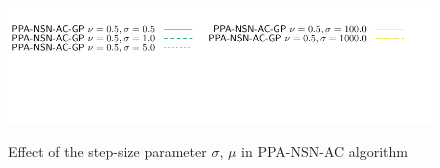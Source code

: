 \documentclass[a4paper]{article}
\begin{document}
\begin{figure}
 \\
{\includegraphics[height=\legendheight]{../figure/PROX/Parameters/nu05/1.0e-08/50/time/profile-Chain_legend.pdf}}
  \caption{Effect of the step-size parameter $\sigma$, $\mu$ in PPA-NSN-AC algorithm}
  \label{fig:PROX/Parameters/nu05}
\end{figure}
\end{document}

